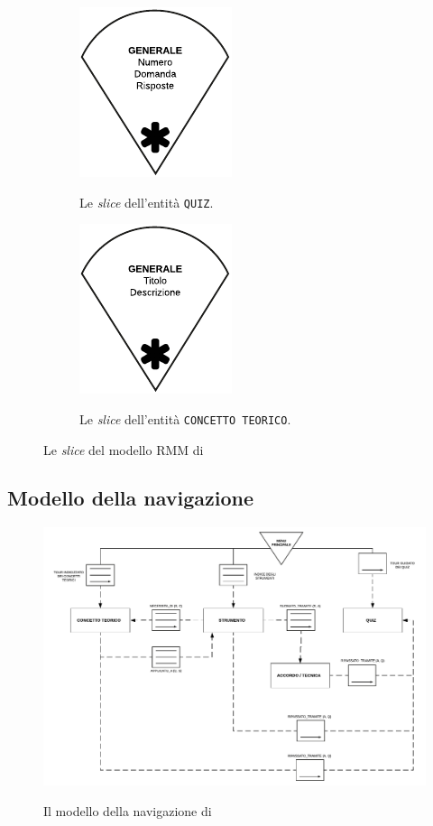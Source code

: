 \begin{figure}[H]\ContinuedFloat
	\begin{subfigure}[t]{.5\textwidth}
		\centering
		\includegraphics[scale=1]{modello_rmm/slice_quiz}
		\label{fig:slice:quiz}
		\caption{Le \emph{slice} dell'entità \texttt{QUIZ}.}
	\end{subfigure}%
	\begin{subfigure}[t]{.5\textwidth}
		\centering
		\includegraphics[scale=1]{modello_rmm/slice_concetto_teorico}
		\label{fig:slice:concetto-teorico}
		\caption{Le \emph{slice} dell'entità \texttt{CONCETTO TEORICO}.}
	\end{subfigure}
	\label{fig:slice}
	\caption[Le slice del modello RMM]{Le \emph{slice} del modello RMM di \ProjectTitle{}}
\end{figure}
\subsection{Modello della navigazione}
\begin{figure}[H]
	\centering
	\includegraphics[width=\textwidth]{modello_rmm/navigazione}
	\label{fig:modello-navigazione}
	\caption{Il modello della navigazione di \ProjectTitle{}}
\end{figure}